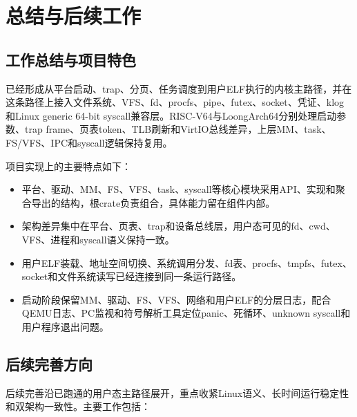%
%

\chapter{总结与后续工作}

\section{工作总结与项目特色}

\wateros{}已经形成从平台启动、trap、分页、任务调度到用户ELF执行的内核主路径，并在这条路径上接入文件系统、VFS、fd、procfs、pipe、futex、socket、凭证、klog和Linux generic 64-bit syscall兼容层。RISC-V64与LoongArch64分别处理启动参数、trap frame、页表token、TLB刷新和VirtIO总线差异，上层MM、task、FS/VFS、IPC和syscall逻辑保持复用。

项目实现上的主要特点如下：

\begin{itemize}
  \item {}平台、驱动、MM、FS、VFS、task、syscall等核心模块采用API、实现和聚合导出的结构，根crate负责组合，具体能力留在组件内部。
  \item {}架构差异集中在平台、页表、trap和设备总线层，用户态可见的fd、cwd、VFS、进程和syscall语义保持一致。
  \item {}用户ELF装载、地址空间切换、系统调用分发、fd表、procfs、tmpfs、futex、socket和文件系统读写已经连接到同一条运行路径。
  \item {}启动阶段保留MM、驱动、FS、VFS、网络和用户ELF的分层日志，配合QEMU日志、PC监视和符号解析工具定位panic、死循环、unknown syscall和用户程序退出问题。
\end{itemize}

\section{后续完善方向}

后续完善沿已跑通的用户态主路径展开，重点收紧Linux语义、长时间运行稳定性和双架构一致性。主要工作包括：

